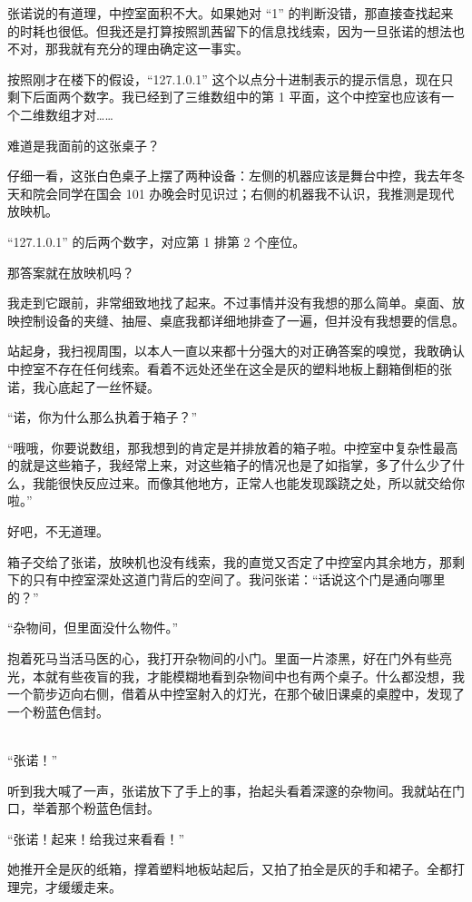 \documentclass[UTF8]{ctexart}
\begin{document}
张诺说的有道理，中控室面积不大。如果她对 “1” 的判断没错，那直接查找起来的时耗也很低。但我还是打算按照凯茜留下的信息找线索，因为一旦张诺的想法也不对，那我就有充分的理由确定这一事实。

按照刚才在楼下的假设，“127.1.0.1” 这个以点分十进制表示的提示信息，现在只剩下后面两个数字。我已经到了三维数组中的第 1 平面，这个中控室也应该有一个二维数组才对……

难道是我面前的这张桌子？

仔细一看，这张白色桌子上摆了两种设备：左侧的机器应该是舞台中控，我去年冬天和院会同学在国会 101 办晚会时见识过；右侧的机器我不认识，我推测是现代放映机。

“127.1.0.1” 的后两个数字，对应第 1 排第 2 个座位。

那答案就在放映机吗？

我走到它跟前，非常细致地找了起来。不过事情并没有我想的那么简单。桌面、放映控制设备的夹缝、抽屉、桌底我都详细地排查了一遍，但并没有我想要的信息。

站起身，我扫视周围，以本人一直以来都十分强大的对正确答案的嗅觉，我敢确认中控室不存在任何线索。看着不远处还坐在这全是灰的塑料地板上翻箱倒柜的张诺，我心底起了一丝怀疑。

“诺，你为什么那么执着于箱子？”

“哦哦，你要说数组，那我想到的肯定是并排放着的箱子啦。中控室中复杂性最高的就是这些箱子，我经常上来，对这些箱子的情况也是了如指掌，多了什么少了什么，我能很快反应过来。而像其他地方，正常人也能发现蹊跷之处，所以就交给你啦。”

好吧，不无道理。

箱子交给了张诺，放映机也没有线索，我的直觉又否定了中控室内其余地方，那剩下的只有中控室深处这道门背后的空间了。我问张诺：“话说这个门是通向哪里的？”

“杂物间，但里面没什么物件。”

抱着死马当活马医的心，我打开杂物间的小门。里面一片漆黑，好在门外有些亮光，本就有些夜盲的我，才能模糊地看到杂物间中也有两个桌子。什么都没想，我一个箭步迈向右侧，借着从中控室射入的灯光，在那个破旧课桌的桌膛中，发现了一个粉蓝色信封。

~\\

“张诺！”

听到我大喊了一声，张诺放下了手上的事，抬起头看着深邃的杂物间。我就站在门口，举着那个粉蓝色信封。

“张诺！起来！给我过来看看！”

她推开全是灰的纸箱，撑着塑料地板站起后，又拍了拍全是灰的手和裙子。全都打理完，才缓缓走来。
\end{document}
